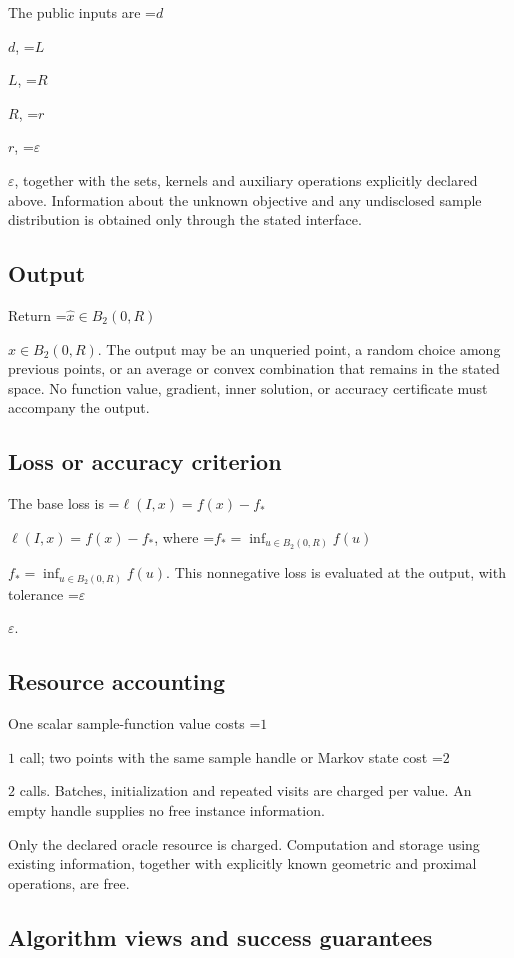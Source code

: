 \documentclass[10pt,a4paper]{article}
\newcommand{\AtlasMath}[1]{\par\begingroup\centering\setbox0=\hbox{$\displaystyle #1$}\ifdim\wd0>1.4\linewidth\typeout{ATLAS WIDE FORMULA: \the\wd0}\fi\ifdim\wd0>\linewidth\resizebox{\linewidth}{!}{\box0}\else\box0\fi\par\endgroup}
\newcommand{\AtlasInlineMath}[1]{\begingroup\setbox0=\hbox{$#1$}\ifdim\wd0>.4\linewidth\endgroup\AtlasMath{#1}\else\endgroup$#1$\fi}
\begin{document}
The public inputs are \AtlasInlineMath{d}, \AtlasInlineMath{L}, \AtlasInlineMath{R}, \AtlasInlineMath{r}, \AtlasInlineMath{\varepsilon}, together with the sets, kernels and auxiliary operations explicitly declared above. Information about the unknown objective and any undisclosed sample distribution is obtained only through the stated interface.



\subsection{Output}


Return \AtlasInlineMath{\widehat{x}\in B_2(0,R)}. The output may be an unqueried point, a random choice among previous points, or an average or convex combination that remains in the stated space. No function value, gradient, inner solution, or accuracy certificate must accompany the output.



\subsection{Loss or accuracy criterion}


The base loss is \AtlasInlineMath{\ell(I,x)=f(x)-f_*}, where \AtlasInlineMath{f_*=\inf_{u\in B_2(0,R)}f(u)}. This nonnegative loss is evaluated at the output, with tolerance \AtlasInlineMath{\varepsilon}.



\subsection{Resource accounting}


One scalar sample-function value costs \AtlasInlineMath{1} call; two points with the same sample handle or Markov state cost \AtlasInlineMath{2} calls. Batches, initialization and repeated visits are charged per value. An empty handle supplies no free instance information.



Only the declared oracle resource is charged. Computation and storage using existing information, together with explicitly known geometric and proximal operations, are free.



\subsection{Algorithm views and success guarantees}
\end{document}
